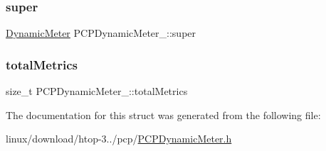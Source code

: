 \subsubsection{\texorpdfstring{super}{super}}
{\footnotesize\ttfamily \hyperlink{DynamicMeter_8h_a4836428310d7591a9859c041b4ccef09}{Dynamic\+Meter} P\+C\+P\+Dynamic\+Meter\+\_\+\+::super}

\mbox{\label{structPCPDynamicMeter___a21051cc7a66bba7b9dcd80431e42dde8}} 
\subsubsection{\texorpdfstring{total\+Metrics}{totalMetrics}}
{\footnotesize\ttfamily size\+\_\+t P\+C\+P\+Dynamic\+Meter\+\_\+\+::total\+Metrics}



The documentation for this struct was generated from the following file\+:\begin{DoxyCompactItemize}
\item 
linux/download/htop-\/3../pcp/\hyperlink{PCPDynamicMeter_8h}{P\+C\+P\+Dynamic\+Meter.\+h}\end{DoxyCompactItemize}
